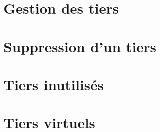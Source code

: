 \section{Gestion des tiers\label{thirdparties-management}}


\section{Suppression d'un tiers\label{thirdparties-delete}}


\section{Tiers inutilisés\label{thirdparties-unused}}


\section{Tiers virtuels\label{thirdparties-virtualCreate}}



